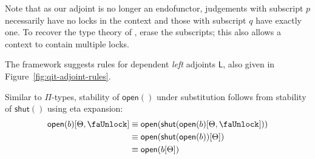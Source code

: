\documentclass[10pt]{article}
\theoremstyle{definition}
\newcommand{\lock}{\text{\faUnlock}}
\newcommand{\RI}[1]{\mathsf{shut}({#1})}
\newcommand{\RE}[1]{\mathsf{open}({#1})}
\newcommand{\Ltype}[1]{\mathsf{L}{#1}}
\begin{document}
Note that as our adjoint is no longer an endofunctor, judgements with subscript $p$ necessarily have no locks in the context and those with subscript $q$ have exactly one. To recover the type theory of , erase the subscripts; this also allows a context to contain multiple locks. 

The framework suggests rules for dependent \emph{left} adjoints $\Ltype{}$, also given in Figure~\ref{fig:qit-adjoint-rules}. 

Similar to $\Pi$-types, stability of $\RE{}$ under substitution follows from stability of $\RI{}$ using eta expansion:
\begin{align*}
\RE{b}[\Theta, \lock] 
&\equiv \RE{\RI{\RE{b}[\Theta, \lock]}} \\
&\equiv \RE{\RI{\RE{b}}[\Theta]} \\
&\equiv \RE{b[\Theta]}
\end{align*}
\end{document}

